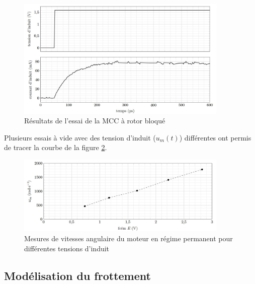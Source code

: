 \begin{figure}[!htb]
\begin{center}
\includegraphics[width=0.9\textwidth]{images/image_fig9.jpg}
\caption{Résultats de l’essai de la MCC à rotor bloqué \label{fig9}}
\end{center}
\end{figure}


Plusieurs essais à vide avec des tension d'induit ($u_m(t)$) différentes ont permis de tracer la courbe de la
figure \ref{fig12}.

\ifprof
\begin{corrige}
\end{corrige}
\else
\fi


\begin{figure}[!htb]
\begin{center}
\includegraphics[width=0.9\textwidth]{images/image_fig12.jpg}
\caption{Mesures de vitesses angulaire du moteur en régime permanent pour différentes tensions d’induit \label{fig12}}
\end{center}
\end{figure}

\subsection{Modélisation du frottement}

